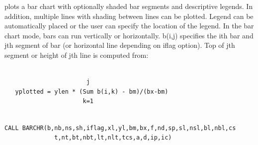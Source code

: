 \documentclass[11pt]{report}
\begin{document}
 plots a bar chart with optionally shaded bar segments and
descriptive legends.  In addition, multiple lines with shading between
lines can be plotted.  Legend can be automatically placed
or the user can specify the location of the legend.  In the bar chart
mode, bars can run vertically or horizontally.
b(i,j) specifies the ith bar and jth segment of bar (or horizontal line
depending on iflag option).  Top of jth segment or height of jth line
is computed from:
\begin{verbatim}

                       j
   yplotted = ylen * (Sum b(i,k) - bm)/(bx-bm)
                      k=1
\end{verbatim}
\begin{verbatim}

CALL BARCHR(b,nb,ns,sh,iflag,xl,yl,bm,bx,f,nd,sp,sl,nsl,bl,nbl,cs
              t,nt,bt,nbt,lt,nlt,tcs,a,d,ip,ic)


\end{verbatim}
\end{document}
